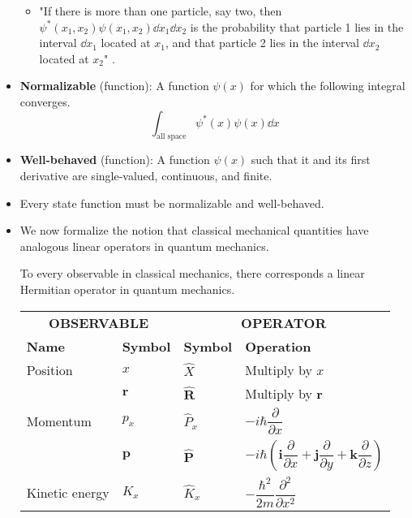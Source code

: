 \documentclass[../notes.tex]{subfiles}
\begin{document}
\begin{itemize}
\begin{itemize}
        \item "If there is more than one particle, say two, then $\psi^*(x_1,x_2)\psi(x_1,x_2)\dd{x_1}\dd{x_2}$ is the probability that particle 1 lies in the interval $\dd{x_1}$ located at $x_1$, and that particle 2 lies in the interval $\dd{x_2}$ located at $x_2$" \parencite[116]{bib:McQuarrieSimon}.
    \end{itemize}
    \item \textbf{Normalizable} (function): A function $\psi(x)$ for which the following integral converges.
    \begin{equation*}
        \int_\text{all space}\psi^*(x)\psi(x)\dd{x}
    \end{equation*}
    \item \textbf{Well-behaved} (function): A function $\psi(x)$ such that it and its first derivative are single-valued, continuous, and finite.
    \item Every state function must be normalizable and well-behaved.
    \item We now formalize the notion that classical mechanical quantities have analogous linear operators in quantum mechanics.
    \begin{postulate}
        To every observable in classical mechanics, there corresponds a linear Hermitian operator in quantum mechanics.
    \end{postulate}
    \begin{table}[h!]
        \centering
        \renewcommand{\arraystretch}{1.4}
        \small
        \begin{tabular}{ll|ll}
            \toprule
            \multicolumn{2}{c|}{\textbf{OBSERVABLE}} & \multicolumn{2}{c}{\textbf{OPERATOR}}\\
            \textbf{Name} & \textbf{Symbol} & \textbf{Symbol} & \textbf{Operation}\\
            \midrule
            Position & $x$ & $\hat{X}$ & Multiply by $x$\\
             & $\mathbf{r}$ & $\mathbf{\hat{R}}$ & Multiply by $\mathbf{r}$\\
            \hline
            \rule{0pt}{6mm}Momentum & $p_x$ & $\hat{P}_x$ & $-i\hbar\dfrac{\partial}{\partial x}$\\
            \rule{0pt}{7mm} & $\mathbf{p}$ & $\mathbf{\hat{P}}$ & $-i\hbar\left( \mathbf{i}\dfrac{\partial}{\partial x}+\mathbf{j}\dfrac{\partial}{\partial y}+\mathbf{k}\dfrac{\partial}{\partial z} \right)$\\
            \hline
            \rule{0pt}{6mm}Kinetic energy & $K_x$ & $\hat{K}_x$ & $-\dfrac{\hbar^2}{2m}\dfrac{\partial^2}{\partial x^2}$\\

\end{tabular}
\end{table}
\end{itemize}
\end{document}
